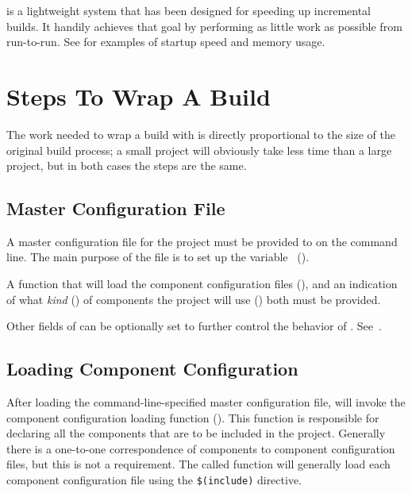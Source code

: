 \lmsbw is a lightweight system that has been designed for speeding up
incremental builds.  It handily achieves that goal by performing as
little work as possible from run-to-run.  See
 for examples of startup speed and memory
usage.

\section{Steps To Wrap A Build}

The work needed to wrap a build with \lmsbw is directly proportional
to the size of the original build process; a small project will
obviously take less time than a large project, but in both cases the
steps are the same.

\subsection{Master Configuration File}

A master configuration file for the project must be provided to \lmsbw
on the command line.  The main purpose of the file is to set up the
\lmsbwconfiguration variable~ ().

A \gnumake function that will load the component configuration files
(), and an indication of
what \emph{kind} () of components the project
will use () both must be
provided.

Other fields of \lmsbwconfiguration can be optionally set to further
control the behavior of \lmsbw.
See~.

\subsection{Loading Component Configuration}

After loading the command-line-specified master configuration file,
\lmsbw will invoke the component configuration loading function
().  This function is
responsible for declaring all the components that are to be included
in the project.  Generally there is a one-to-one correspondence of
components to component configuration files, but this is not a
requirement.  The called function will generally load each component
configuration file using the \gnumake \texttt{\$(include)} directive.

